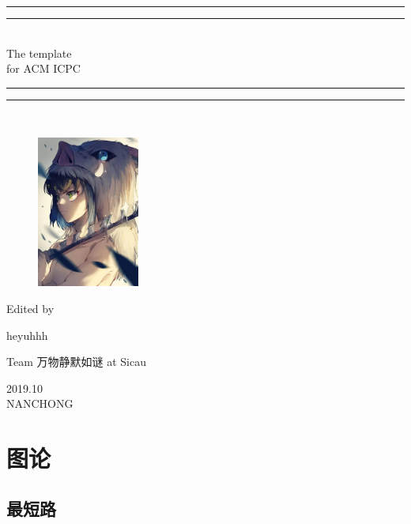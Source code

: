 \documentclass[a4paper,11pt,twoside,fontset = fandol,UTF8]{ctexbook} %
\begin{document}
 
	\begin{titlepage}       %
		\centering
		\vspace*{\baselineskip}
		\rule{\textwidth}{1.6pt}\vspace*{-\baselineskip}\vspace*{2pt}
		\rule{\textwidth}{0.4pt}\\[\baselineskip]
		{\LARGE The template\\[\baselineskip]\small for ACM ICPC}
		\\[0.2\baselineskip]
		\rule{\textwidth}{0.4pt}\vspace*{-\baselineskip}\vspace{3.2pt}
		\rule{\textwidth}{1.6pt}\\[\baselineskip]
		\scshape
		
		\begin{figure}[!htb]
			\centering
			\includegraphics[width=0.3\textwidth]{icpc}    %
		\end{figure}
		
		\vspace*{3\baselineskip}
		Edited by \\[\baselineskip] {heyuhhh\par}
		{Team \Large 万物静默如谜 \normalsize{at Sicau}\par }
		\vfill
		{\scshape 2019.10} \\{\large NANCHONG}\par
	\end{titlepage}
	\newpage            %
	\tableofcontents     %
	\chapter{图论}    %
	\setcounter{page}{1} %
	\section{最短路}   %
\end{document}
